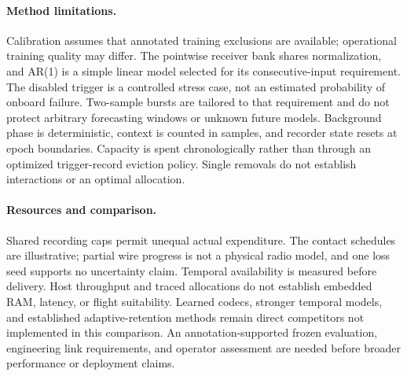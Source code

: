 \paragraph{Method limitations.}
Calibration assumes that annotated training exclusions are available; operational
training quality may differ. The pointwise receiver bank shares normalization,
and AR(1) is a simple linear
model selected for its consecutive-input requirement. The disabled trigger is a
controlled stress case, not an estimated probability of onboard failure. Two-sample
bursts are tailored to that requirement and do not protect arbitrary forecasting
windows or unknown future models. Background phase is deterministic, context is
counted in samples, and recorder state resets at epoch boundaries. Capacity is
spent chronologically rather than through an optimized trigger-record eviction
policy. Single removals do not establish interactions or an optimal allocation.

\paragraph{Resources and comparison.}
Shared recording caps permit unequal actual expenditure. The contact schedules
are illustrative; partial wire progress is not a physical radio model, and one
loss seed supports no uncertainty claim. Temporal availability is measured before
delivery. Host throughput and traced allocations do not establish embedded RAM,
latency, or flight suitability. Learned codecs, stronger temporal models, and
established adaptive-retention methods remain direct competitors not implemented
in this comparison. An annotation-supported frozen evaluation, engineering link
requirements, and operator assessment are needed before broader performance or
deployment claims.
